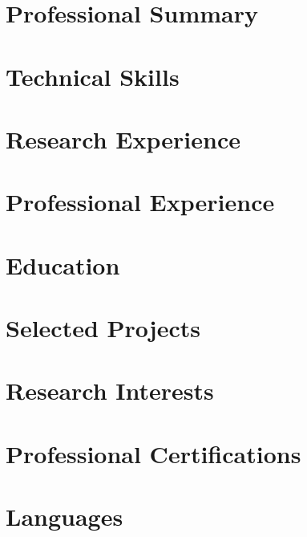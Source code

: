 \documentclass[10pt]{article}
\begin{document}
	\enlargethispage{2\baselineskip} %
	
	\pagestyle{others}
	\thispagestyle{first_page}
	
	\section{Professional Summary}
	
	
	\section{Technical Skills}
	
	
	\section{Research Experience}
	
	
	\section{Professional Experience}
	
	
	\section{Education}
	
	
	\newpage
	
	\section{Selected Projects}
	
	
	\section{Research Interests}
	
	
	\section{Professional Certifications}
	
	
	\section{Languages}
	
	
\end{document}
